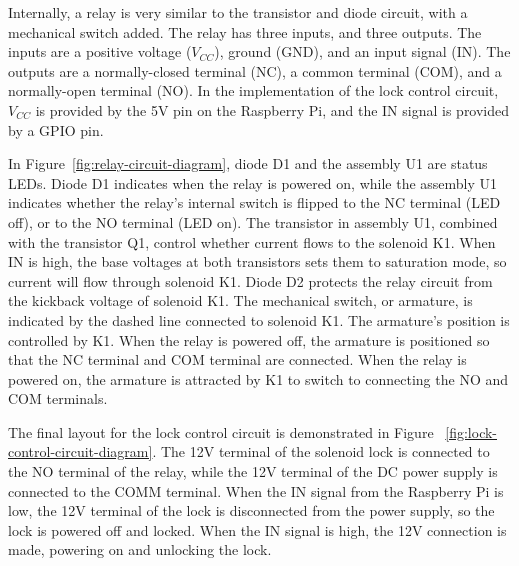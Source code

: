 \documentclass[12pt]{report}
\begin{document}
Internally, a relay is very similar to the transistor and diode circuit, with a mechanical switch added. The relay 
has three inputs, and three outputs. The inputs are a positive voltage ($ V_{CC} $), ground (GND), and an input signal 
(IN). The outputs are a normally-closed terminal (NC), a common terminal (COM), and a normally-open terminal (NO). In 
the implementation of the lock control circuit, $ V_{CC} $ is provided by the 5V pin on the Raspberry Pi, and the IN
signal is provided by a GPIO pin.

In Figure~\ref{fig:relay-circuit-diagram}, diode D1 and the assembly U1 are status LEDs. Diode D1 indicates when the 
relay is powered on, while the assembly U1 indicates whether the relay's internal switch is flipped to the NC terminal 
(LED off), or to the NO terminal (LED on). The transistor in assembly U1, combined with the transistor Q1, control 
whether current flows to the solenoid K1. When IN is high, the base voltages at both transistors sets them to 
saturation mode, so current will flow through solenoid K1. Diode D2 protects the relay circuit from the kickback 
voltage of solenoid K1. The mechanical switch, or armature, is indicated by the dashed line connected to solenoid K1. 
The armature's position is controlled by K1. When the relay is powered off, the armature is positioned so that the NC 
terminal and COM terminal are connected. When the relay is powered on, the armature is attracted by K1 to switch to 
connecting the NO and COM terminals.

The final layout for the lock control circuit is demonstrated in Figure ~\ref{fig:lock-control-circuit-diagram}. The 
12V terminal of the solenoid lock is connected to the NO terminal of the relay, while the 12V terminal of the DC power 
supply is connected to the COMM terminal. When the IN signal from the Raspberry Pi is low, the 12V terminal of the lock 
is disconnected from the power supply, so the lock is powered off and locked. When the IN signal is high, the 12V 
connection is made, powering on and unlocking the lock.
\end{document}
